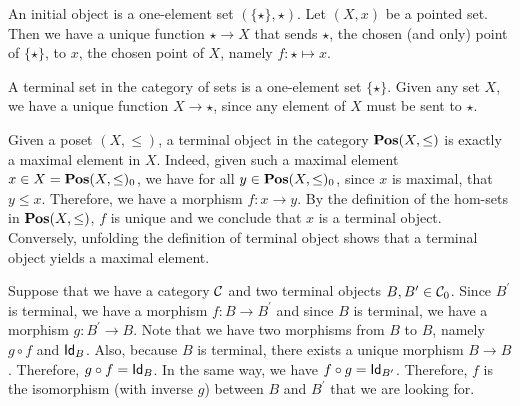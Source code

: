 \begin{solution}\label{sol:initial_pointset}
	An initial object is a one-element set $ (\{ \star \}, \star) $. Let $ (X, x) $ be a pointed set. Then we have a unique function $ \star \to X $ that sends $ \star $, the chosen (and only) point of $ \{ \star \} $, to $ x $, the chosen point of $ X $, namely $ f: \star \mapsto x $.
\end{solution}

\begin{solution}\label{sol:terminal_set}
	A terminal set in the category of sets is a one-element set $ \{ \star \} $. Given any set $ X $, we have a unique function $ X \to \star $, since any element of $ X $ must be sent to $ \star $.
\end{solution}

\begin{solution}\label{sol:terminal_posetcat}
	Given a poset $ (X, \leq) $, a terminal object in the category $ \POS(X, \leq) $ is exactly a maximal element in $ X $. Indeed, given such a maximal element $ x \in X = \POS(X, \leq)_0 $, we have for all $ y \in \POS(X, \leq)_0 $, since $ x $ is maximal, that $ y \leq x $. Therefore, we have a morphism $ f: x \to y $. By the definition of the hom-sets in $ \POS(X, \leq) $, $ f $ is unique and we conclude that $ x $ is a terminal object.
	Conversely, unfolding the definition of terminal object shows that a terminal object yields a maximal element.
\end{solution}

\begin{solution}\label{sol:terminal-unique}
	Suppose that we have a category $ \CC $ and two terminal objects $ B, B^\prime \in \Ob\CC $. Since $ B^\prime $ is terminal, we have a morphism $ f: B \to B^\prime $ and since $ B $ is terminal, we have a morphism $ g: B^\prime \to B $. Note that we have two morphisms from $ B $ to $ B $, namely $ g \circ f $ and $ \Id[B] $. Also, because $ B $ is terminal, there exists a unique morphism $ B \to B $. Therefore, $ g \circ f = \Id[B] $. In the same way, we have $ f \circ g = \Id[B^\prime] $. Therefore, $ f $ is the isomorphism (with inverse $g$) between $ B $ and $ B^\prime $ that we are looking for.
\end{solution}

